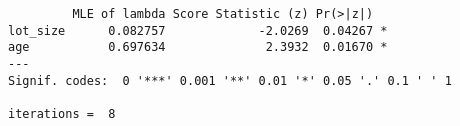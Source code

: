 \begin{verbatim}         MLE of lambda Score Statistic (z) Pr(>|z|)  
lot_size      0.082757             -2.0269  0.04267 *
age           0.697634              2.3932  0.01670 *
---
Signif. codes:  0 '***' 0.001 '**' 0.01 '*' 0.05 '.' 0.1 ' ' 1

iterations =  8 
\end{verbatim}